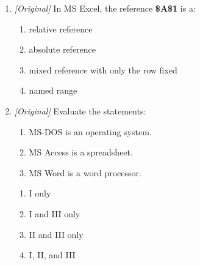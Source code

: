 \documentclass[11pt]{article}
\begin{document}
\begin{enumerate}[label=\textbf{Q\arabic*.}, leftmargin=*]
\begin{enumerate}[label=\Alph*.]
    \item Normal and Slide Sorter
  \end{enumerate}
\item \textit{[Original]} In MS Excel, the reference \textbf{\$A\$1} is a:
  \begin{enumerate}[label=\Alph*.]
    \item relative reference
    \item absolute reference
    \item mixed reference with only the row fixed
    \item named range
  \end{enumerate}
\item \textit{[Original]} Evaluate the statements:
  \begin{enumerate}[label=\Roman*.]
    \item MS-DOS is an operating system.
    \item MS Access is a spreadsheet.
    \item MS Word is a word processor.
  \end{enumerate}
  \begin{enumerate}[label=\Alph*.]
    \item I only
    \item I and III only
    \item II and III only
    \item I, II, and III
  \end{enumerate}


\end{enumerate}
\end{document}
